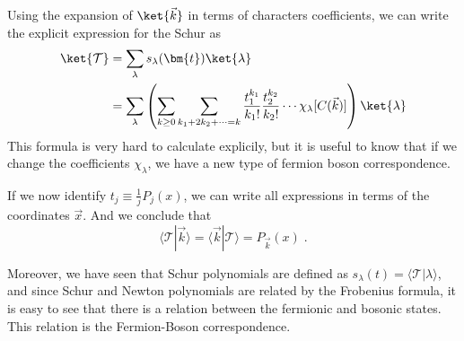 Using the expansion of \(\ket{\vec{k}}\) in terms of characters
coefficients, we can write the explicit expression for the Schur as
\begin{equation}
\begin{split}
  \ket{\mathcal{T}}& = \sum_{\lambda} s_\lambda(\bm{t})\ket{\lambda} \\
    & = \sum_\lambda\left( \sum_{k\geq 0} \sum_{k_1+2k_2+\cdots = k}\frac{t_{1}^{k_1}}{k_1!}
    \frac{t_{2}^{k_2}}{k_2!}\cdots \chi_\lambda [C(\vec{k})] \right) \ket{\lambda}
\end{split}
\end{equation}
This formula is very hard to calculate explicily, but it is useful to know that
if we change the coefficients \(\chi_\lambda\), we have a new type of fermion boson
correspondence. 

If we now identify \(t_{j} \equiv \frac{1}{j}P_j(x)\), we can
write all expressions in terms of the coordinates \(\vec{x}\). And we
conclude that
\begin{equation}
\langle \mathcal{T}| \vec{k} \rangle= \langle \vec{k} |\mathcal{T}\rangle = P_{\vec{k}}(x)\; .
\end{equation}

Moreover, we have seen that Schur polynomials are defined as
\(s_{\lambda}(t)=\langle \mathcal{T}| \lambda \rangle\), and since
Schur and Newton polynomials are related by the Frobenius formula, it
is easy to see that there is a relation between the fermionic and
bosonic states. This relation is the Fermion-Boson correspondence.
